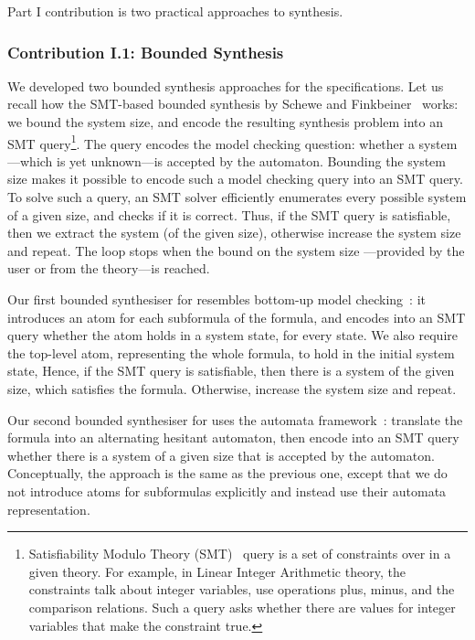 Part I contribution is two practical approaches to \CTLstar synthesis.

\subsubsection*{Contribution I.1: \CTLstar Bounded Synthesis}

We developed two bounded synthesis approaches for the \CTLstar specifications.
Let us recall how the SMT-based bounded synthesis by Schewe and Finkbeiner~\cite{BS} works:
we bound the system size, and
encode the resulting synthesis problem into an SMT query\footnote{%
  Satisfiability Modulo Theory (SMT)~\cite{SMT} query is a
  set of constraints over in a given theory.
  For example, in Linear Integer Arithmetic theory,
  the constraints talk about integer variables,
  use operations plus, minus, and the comparison relations.
  Such a query asks whether there are values for integer variables
  that make the constraint true.}.
The query encodes the model checking question:
whether a system---which is yet unknown---is accepted by the automaton.
Bounding the system size makes it possible to encode such a model checking query
into an SMT query.
To solve such a query,
an SMT solver efficiently enumerates every possible system of a given size,
and checks if it is correct.
Thus, if the SMT query is satisfiable, then we extract the system (of the given size),
otherwise increase the system size and repeat.
The loop stops when the bound on the system size%
---provided by the user or from the theory---is reached.

Our first bounded synthesiser for \CTLstar
resembles bottom-up \CTLstar model checking~\cite{PrinciplesMC}:
it introduces an atom for each subformula of the \CTLstar formula,
and encodes into an SMT query whether the atom holds in a system state,
for every state.
We also require the top-level atom, representing the whole \CTLstar formula,
to hold in the initial system state,
Hence, if the SMT query is satisfiable,
then there is a system of the given size,
which satisfies the \CTLstar formula.
Otherwise, increase the system size and repeat.

Our second bounded synthesiser for \CTLstar uses the automata framework~\cite{ATA}:
translate the \CTLstar formula into an alternating hesitant automaton,
then encode into an SMT query
whether there is a system of a given size that is accepted by the automaton.
Conceptually, the approach is the same as the previous one,
except that we do not introduce atoms for subformulas explicitly
and instead use their automata representation.

